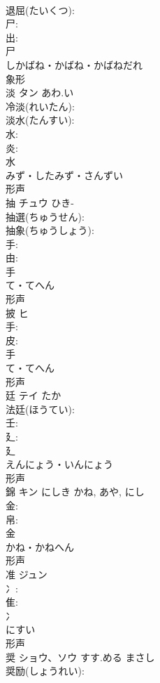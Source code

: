 \documentclass[8pt]{extreport}
\begin{document}
\begin{CJK}{UTF8}{min}
\\	退屈(たいくつ): 
\\	尸: 
\\	出: 
\\	尸	
\\	しかばね・かばね・かばねだれ	
\\	象形 
\\	淡	タン	あわ.い		
\\	冷淡(れいたん): 
\\	淡水(たんすい): 
\\	水: 
\\	炎: 
\\	水	
\\	みず・したみず・さんずい	
\\	形声 
\\	抽	チュウ	ひき-		
\\	抽選(ちゅうせん): 
\\	抽象(ちゅうしょう): 
\\	手: 
\\	由: 
\\	手	
\\	て・てへん	
\\	形声 
\\	披	ヒ			
\\	手: 
\\	皮: 
\\	手	
\\	て・てへん	
\\	形声 
\\	廷	テイ		たか	
\\	法廷(ほうてい): 
\\	壬: 
\\	廴: 
\\	廴	
\\	えんにょう・いんにょう	
\\	形声 
\\	錦	キン	にしき	かね, あや, にし	
\\	金: 
\\	帛: 
\\	金	
\\	かね・かねへん	
\\	形声 
\\	准	ジュン			
\\	冫: 
\\	隹: 
\\	冫	
\\	にすい	
\\	形声 
\\	奨	ショウ、ソウ	すす.める	まさし	
\\	奨励(しょうれい): 

\end{CJK}
\end{document}
